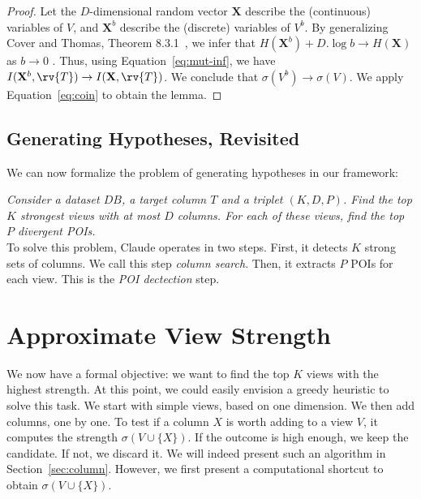 \begin{proof}
    Let the $D$-dimensional random vector $\mathbf{X}$ describe the
    (continuous) variables of $V$, and $\mathbf{X}^b$ describe the (discrete)
    variables of $V^b$. By generalizing Cover and Thomas, Theorem
    8.3.1~\cite{cover2012elements}, we infer that $H(\mathbf{X}^b) + D.\log{b}
    \to H(\mathbf{X})$ as $b \to 0$ .  Thus, using Equation~\ref{eq:mut-inf},
    we have $I(\mathbf{X}^b, \rv{T}) \to I(\mathbf{X}, \rv{T})$. We conclude
    that $\sigma(V^b) \to \sigma(V)$. We apply Equation~\ref{eq:coin} to obtain
    the lemma.
\end{proof}

\subsection{Generating Hypotheses, Revisited}

We can now formalize the  problem of generating hypotheses in our framework:

\emph{Consider a dataset $DB$, a target column $T$ and a triplet $(K, D, P)$. Find
the top $K$ strongest views with at most $D$ columns. For each of these
views, find the top $P$ divergent POIs.}\\
To solve this problem, Claude operates in two steps. First, it detects $K$
strong sets of columns.  We call this step \emph{column search}.  Then, it
extracts $P$ POIs for each view. This is the \emph{POI dectection} step.




\section{Approximate View Strength}
\label{sec:approximate}

We now have a formal objective: we want to find the top $K$ views with the highest
strength. At this point, we could easily envision a greedy heuristic to solve
this task. We start with simple views, based on one dimension. We then add
columns, one by one.  To test if a column $X$ is worth adding to a view $V$,
it computes the strength $\sigma(V \cup \{X\})$. If the outcome is high enough,
we keep the candidate. If not, we discard it. We will indeed present such an
algorithm in Section~\ref{sec:column}. However, we first present a
computational shortcut to obtain $\sigma(V \cup \{X\})$.

